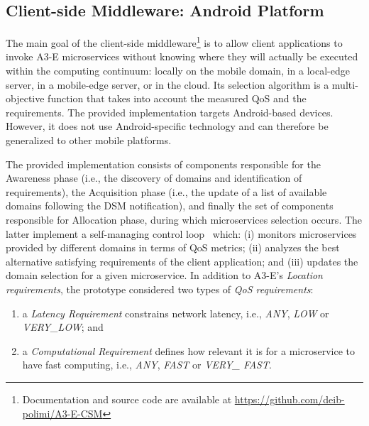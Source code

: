 \subsection{Client-side Middleware: Android Platform}\label{sec:CSM}


The main goal of the client-side middleware\footnote{Documentation and source code are available at \url{https://github.com/deib-polimi/A3-E-CSM}} is to allow client applications to invoke A3-E microservices without knowing where they will actually be executed within the computing continuum: locally on the mobile domain, in a local-edge server, in a mobile-edge server, or in the cloud. Its selection algorithm is a multi-objective function that takes into account the measured QoS and the requirements. The provided implementation targets Android-based devices. However, it does not use Android-specific technology and can therefore be generalized to other mobile platforms. 


The provided implementation consists of components responsible for the Awareness phase (i.e., the discovery of domains and identification of requirements), the Acquisition phase (i.e., the update of a list of available domains following the DSM notification), and finally the set of  components responsible for Allocation phase, during which microservices selection occurs. The latter implement a self-managing control loop~\cite{kephart2003vision} which: (i) monitors microservices provided by different domains in terms of QoS metrics; (ii) analyzes the best alternative satisfying requirements of the client application; and (iii) updates the domain selection for a given microservice. In addition to A3-E's \textit{Location requirements}, the prototype considered two types of \textit{QoS requirements}:

\begin{enumerate}


	\item a \textit{Latency Requirement} constrains network latency, i.e., \textit{ANY}, \textit{LOW} or \textit{VERY\_LOW}; and 
	

	\item a \textit{Computational Requirement} defines how relevant it is for a microservice to have fast computing, i.e., \textit{ANY}, \textit{FAST} or \textit{VERY\_ FAST}. 
\end{enumerate}

